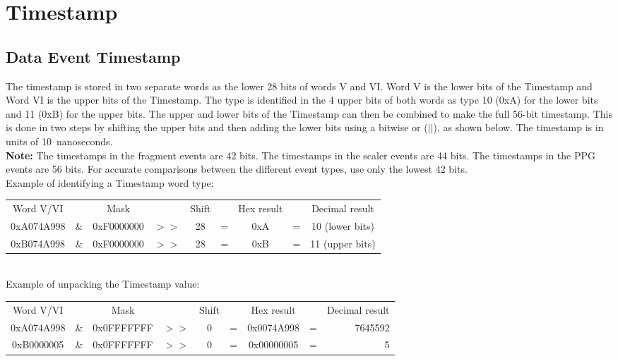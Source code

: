 \documentclass[letterpaper,12pt,notitlepage]{report}
\begin{document}
\section{Timestamp}

\subsection{Data Event Timestamp}
The timestamp is stored in two separate words as the lower 28 bits of words V and VI. Word V is the lower bits of the Timestamp and Word VI is the upper bits of the Timestamp. The type is identified in the 4 upper bits of both words as type 10 (0xA) for the lower bits and 11 (0xB) for the upper bits. The upper and lower bits of the Timestamp can then be combined to make the full 56-bit timestamp. This is done in two steps by shifting the upper bits and then adding the lower bits using a bitwise or ($||$), as shown below. The timestamp is in units of 10~nanoseconds.\\

{\bf Note:} The timestamps in the fragment events are 42 bits. The timestamps in the scaler events are 44 bits. The timestamps in the PPG events are 56 bits. For accurate comparisons between the different event types, use only the lowest 42 bits.\\

Example of identifying a Timestamp word type:\\

\begin{tabular}{ccccccccc}
Word V/VI &  & Mask & & Shift & & Hex result & & Decimal result\\
0xA074A998 & \& & 0xF0000000 & $>>$ & 28 & = & 0xA & = & 10 (lower bits)\\
0xB074A998 & \& & 0xF0000000 & $>>$ & 28 & = & 0xB & = & 11 (upper bits)\\
\end{tabular}\\

Example of unpacking the Timestamp value:\\

\begin{tabular}{ccccccccr}
Word V/VI &  & Mask & & Shift & & Hex result & & Decimal result\\
0xA074A998 & \& & 0x0FFFFFFF & $>>$ & 0 & = & 0x0074A998 & = & 7645592\\
0xB0000005 & \& & 0x0FFFFFFF & $>>$ & 0 & = & 0x00000005 & = & 5\\
\end{tabular}\\
\end{document}
